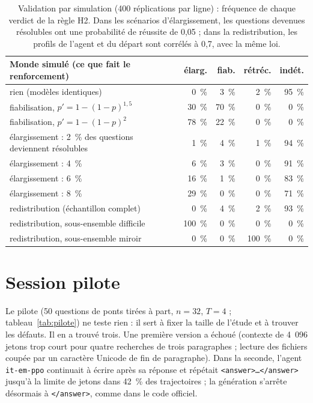 \documentclass[11pt,a4paper]{article}
\begin{document}
\begin{table}[h]\centering\small
\begin{tabular}{>{\raggedright\arraybackslash}p{6.4cm}rrrr}\toprule
Monde simulé (ce que fait le renforcement) & élarg. & fiab. & rétréc. & indét.\\\midrule
rien (modèles identiques) & 0~\% & 3~\% & 2~\% & 95~\%\\
fiabilisation, $p' = 1 - (1-p)^{1{,}5}$ & 30~\% & 70~\% & 0~\% & 0~\%\\
fiabilisation, $p' = 1 - (1-p)^{2}$ & 78~\% & 22~\% & 0~\% & 0~\%\\
élargissement : 2~\% des questions deviennent résolubles & 1~\% & 4~\% & 1~\% & 94~\%\\
élargissement : 4~\% & 6~\% & 3~\% & 0~\% & 91~\%\\
élargissement : 6~\% & 16~\% & 1~\% & 0~\% & 83~\%\\
élargissement : 8~\% & 29~\% & 0~\% & 0~\% & 71~\%\\
redistribution (échantillon complet) & 0~\% & 4~\% & 2~\% & 93~\%\\
redistribution, sous-ensemble difficile & 100~\% & 0~\% & 0~\% & 0~\%\\
redistribution, sous-ensemble miroir & 0~\% & 0~\% & 100~\% & 0~\%\\\bottomrule
\end{tabular}
\caption{Validation par simulation (400 réplications par ligne) : fréquence de chaque verdict de la règle H2. Dans les scénarios d'élargissement, les questions devenues résolubles ont une probabilité de réussite de 0,05 ; dans la redistribution, les profils de l'agent et du départ sont corrélés à 0,7, avec la même loi.}\label{tab:simulation}
\end{table}

\section{Session pilote}

Le pilote (50 questions de ponts tirées à part, $n = 32$, $T = 4$ ; tableau~\ref{tab:pilote}) ne teste rien : il sert à fixer la taille de l'étude et à trouver les défauts. Il en a trouvé trois. Une première version a échoué (contexte de 4~096 jetons trop court pour quatre recherches de trois paragraphes ; lecture des fichiers coupée par un caractère Unicode de fin de paragraphe). Dans la seconde, l'agent \texttt{it-em-ppo} continuait à écrire après sa réponse et répétait \texttt{<answer>…</answer>} jusqu'à la limite de jetons dans 42~\% des trajectoires ; la génération s'arrête désormais à \texttt{</answer>}, comme dans le code officiel.
\end{document}
